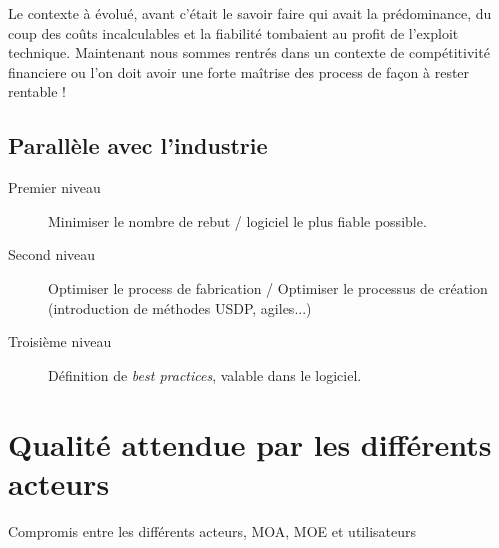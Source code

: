 Le contexte à évolué, avant c’était le savoir faire qui avait la prédominance, du coup des coûts incalculables et la fiabilité tombaient au profit de l’exploit technique. Maintenant nous sommes rentrés dans un contexte de compétitivité financiere ou l'on doit avoir une forte maîtrise des process de façon à rester rentable !

	\subsection{Parallèle avec l’industrie}
	
	\begin{description}
	\item[Premier niveau] Minimiser le nombre de rebut  / logiciel le plus fiable possible.
	\item[Second niveau] Optimiser le process de fabrication  / Optimiser le processus de création (introduction de méthodes USDP, agiles...)
	\item[Troisième niveau]Définition de \textsl{best practices}, valable dans le logiciel.
	\end{description}


\section{Qualité attendue par les différents acteurs}

Compromis entre les différents acteurs, MOA, MOE et utilisateurs

